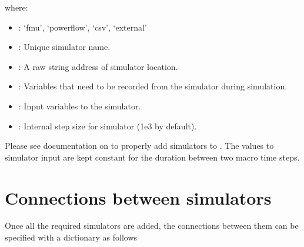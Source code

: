\documentclass[letterpaper,10pt,english]{sphinxmanual}
\begin{document}
where:
\begin{itemize}
\item {} 
 : ‘fmu’, ‘powerflow’, ‘csv’, ‘external’

\item {} 
 : Unique simulator name.

\item {} 
 : A raw string address of simulator location.

\item {} 
 : Variables that need to be recorded from the simulator during simulation.

\item {} 
 : Input variables to the simulator.

\item {} 
 : Internal step size for simulator (1e\sphinxhyphen{}3 by default).

\end{itemize}

Please see documentation on  to properly add simulators to .
The values to simulator input are kept constant for the duration between two macro time steps.


\section{Connections between simulators}
\label{\detokenize{index:connections-between-simulators}}
Once all the required simulators are added, the connections between them can be specified with a dictionary as follows

\begin{sphinxVerbatim}[commandchars=\\\{\}]
    
     
     
\end{sphinxVerbatim}
\end{document}
